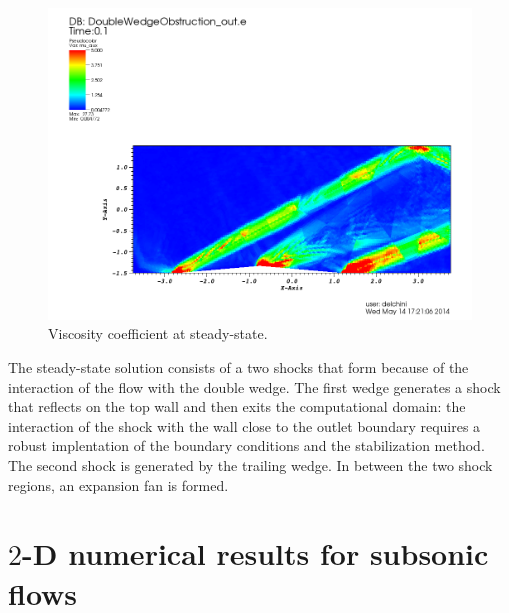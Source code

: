%
        \begin{figure}[H]%
                \centering
                \includegraphics[scale=.50]{figures/DWOViscosityStt.png}
                \caption{Viscosity coefficient at steady-state.}
                \label{fig:2d_dbw_visc_stt}
        \end{figure}
The steady-state solution consists of a two shocks that form because of the interaction of the flow with the double wedge. The first wedge generates a shock that reflects on the top wall and then exits the computational domain: the interaction of the shock with the wall close to the outlet boundary requires a robust implentation of the boundary conditions and the stabilization method. The second shock is generated by the trailing wedge. In between the two shock regions, an expansion fan is formed. 
\section{$2$-D numerical results for subsonic flows} \label{sec:2d-susubsonic-results}
